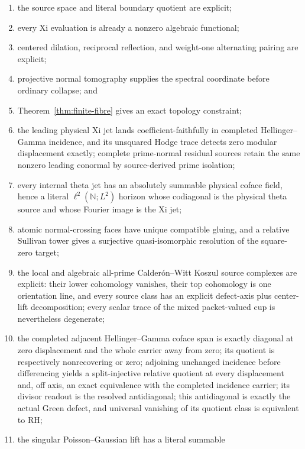\documentclass[11pt]{article}
\theoremstyle{definition}
\theoremstyle{remark}
\begin{document}
\begin{enumerate}[leftmargin=2.2em]
\item the source space and literal boundary quotient are explicit;
\item every Xi evaluation is already a nonzero algebraic functional;
\item centered dilation, reciprocal reflection, and weight-one alternating
      pairing are explicit;
\item projective normal tomography supplies the spectral coordinate
      before ordinary collapse; and
\item Theorem~\ref{thm:finite-fibre} gives an exact topology constraint;
\item the leading physical Xi jet lands coefficient-faithfully in completed
      Hellinger--Gamma incidence, and its unsquared Hodge trace detects zero
      modular displacement exactly; complete prime-normal residual sources
      retain the same nonzero leading conormal by source-derived prime
      isolation;
\item every internal theta jet has an absolutely summable physical coface
      field, hence a literal \(\ell^2(\mathbb N;L^2)\) horizon whose
      codiagonal is the physical theta source and whose Fourier image is the
      Xi jet;
\item atomic normal-crossing faces have unique compatible gluing, and a
      relative Sullivan tower gives a surjective quasi-isomorphic resolution
      of the square-zero target;
\item the local and algebraic all-prime Calder\'on--Witt Koszul source
      complexes are explicit: their lower cohomology vanishes, their top
      cohomology is one orientation line, and every source class has an
      explicit defect-axis plus center-lift decomposition; every scalar trace
      of the mixed packet-valued cup is nevertheless degenerate;
\item the completed adjacent Hellinger--Gamma coface span is exactly diagonal
      at zero displacement and the whole carrier away from zero; its quotient
      is respectively nonrecovering or zero; adjoining unchanged incidence
      before differencing yields a split-injective relative quotient at every
      displacement and, off axis, an exact equivalence with the completed
      incidence carrier; its divisor readout is the resolved antidiagonal; this
      antidiagonal is exactly the actual Green defect, and universal
      vanishing of its quotient class is equivalent to RH;
\item the singular Poisson--Gaussian lift has a literal summable

\end{enumerate}
\end{document}
